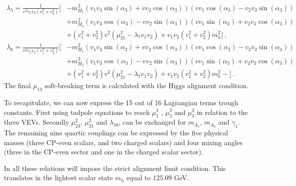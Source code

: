 \documentclass[10pt]{book}
\renewcommand{\(}{\left(}
\renewcommand{\)}{\right)}
\renewcommand{\[}{\left[}
\renewcommand{\]}{\right]}
\begin{document}
%
\begin{equation}
\begin{split}
\lambda_5 = \frac{1}{v^2 v_1 v_2 \left(v_1^2+v_2^2\right)} \Bigg[ 
& -m_{H_1}^2 \left(v_1 v_3 \sin (\alpha_3) + v v_2 \cos (\alpha_3)\right) \left(v v_1 \cos (\alpha_3)-v_2 v_3  \sin (\alpha_3)\right) \\ & + m_{H_2}^2 \left(v_1 v_3 \cos (\alpha_3)  -v v_2 \sin (\alpha_3)\right) \left(v v_1 \sin (\alpha_3) + v_2 v_3 \cos (\alpha_3)\right) \\ & +\left(v_1^2+v_2^2\right) v^2 \left(\mu_{21}^2-\lambda_7 v_1 v_2\right) + v_1 v_2 \left(v_1^2+v_2^2\right) m_h^2 \Bigg]  \ , 
\end{split} 
\end{equation}
%
\begin{equation}
\begin{split}
\lambda_6 = \frac{1}{v^2 v_1 v_2 \left(v_1^2+v_2^2\right)} \Bigg[ &- m_{H_1}^2 \left(v_1 v_3 \sin (\alpha_3)+v v_2 \cos (\alpha_3)\right) \left(v v_1 \cos (\alpha_3)-v_2 v_3 \sin (\alpha_3)\right)  \\ & +  m_{H_2}^2 \left(v_1 v_3 \cos (\alpha_3) -v v_2 \sin (\alpha_3)\right) \left(v v_1 \sin (\alpha_3)+v_2 v_3 \cos (\alpha_3)\right) \\ & +\left(v_1^2+v_2^2\right) v^2 \left(\mu_{21}^2-\lambda_7 v_1 v_2\right) + v_1 v_2 \left(v_1^2+v_2^2\right) m_h^2- \Bigg] \ . 
\end{split} 
\end{equation}
%
The final $\mu_{13}$ soft-breaking term is calculated with the Higgs alignment condition. 

To recapitulate, we can now express the 15 out of 16 Lagrangian terms trough constants. 
%
First using tadpole equations to reach $\mu_{1}^2$ , $\mu_{2}^2$ and $\mu_{3}^2$ in relation to the three VEVs. Secondly $\mu_{23}^2$, $\mu_{21}^2$ and $\lambda_{10}$, can be exchanged for $m_{A_1}$, $m_{A_2}$ and $\gamma_1$. 
%
The remaining nine quartic couplings can be expressed by the five physical masses (three CP-even scalars, and two charged scalars) and four mixing angles (three in the CP-even sector and one in the charged scalar sector). 

In all these relations will impose the strict alignment limit condition. This translates in the lightest scalar state $m_h$ equal to $125.09$ GeV.
%
\end{document}
